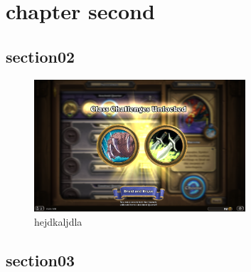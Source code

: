 \chapter{chapter second}
\section{section02}
\begin{figure}
	\centering
	\includegraphics[width=0.7\textwidth,natwidth=1920,natheight=1200]{graphics/hs}
	\caption{hejdkaljdla}
	\label{fig:hs}
\end{figure}
\lipsum[1-2]
\section{section03}